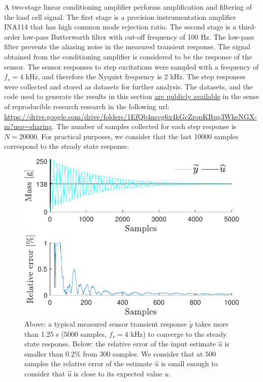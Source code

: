 A two-stage linear conditioning amplifier performs amplification and filtering of the load cell signal.
The first stage is a precision instrumentation amplifier INA114 that has high common mode rejection ratio.
The second stage is a third-order low-pass Butterworth filter with cut-off frequency of 100 Hz.
The low-pass filter prevents the aliasing noise in the measured transient response.
The signal obtained from the conditioning amplifier is considered to be the response of the sensor.
The sensor responses to step excitations were sampled with a frequency of $f_s=4$ kHz, and therefore the Nyquist frequency is 2 kHz.
The step responses were collected and stored as datasets for further analysis.
\color{blue}The datasets, and the code used to generate the results in this section \href{https://drive.google.com/drive/folders/1EfQb4nccg6x4kGcZropKRug3WkeNGX-m?usp=sharing}{\color{blue}are publicly available} in the sense of reproducible research research in the following url: \href{https://drive.google.com/drive/folders/1EfQb4nccg6x4kGcZropKRug3WkeNGX-m?usp=sharing}{https://drive.google.com/drive/folders/1EfQb4nccg6x4kGcZropKRug3WkeNGX-m?usp=sharing}\color{black}.  
The number of samples collected for each step response is $N=20000$.
For practical purposes, we consider that the last 10000 samples correspond to the steady state response.
\begin{figure}[!htb]
\centering
\includegraphics[width=0.69\columnwidth]{./ChapterExperimentalValidation/fig/Fig_6.pdf} 
\caption{ \label{fig:uh_exp} 
Above: a typical measured sensor transient response $\widetilde{y}$ takes more than 1.25 s (5000 samples, $f_s = 4$ kHz) to converge to the steady state response. 
Below: the relative error of the input estimate $\widehat{u}$ is smaller than 0.2\% from 300 samples.
We consider that at $500$ samples the relative error of the estimate $\widehat{u}$ is small enough to consider that $\widehat{u}$ is close to its expected value $u$.  }
\end{figure}


